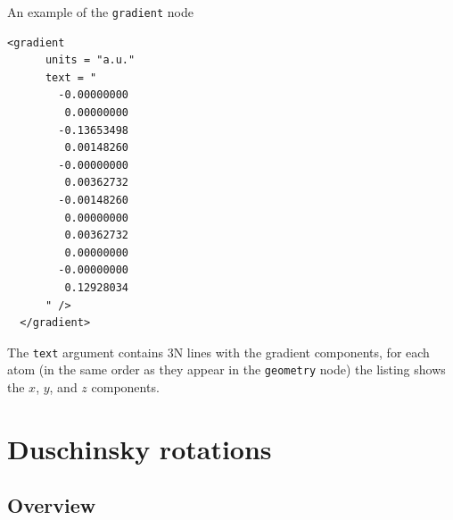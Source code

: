 \documentclass[11pt]{article}
\begin{document}
An example of the {\tt{}gradient} node
\begin{lstlisting}[frame=single,framerule=0pt]
  <gradient
      units = "a.u."
      text = "
        -0.00000000  
         0.00000000  
        -0.13653498  
         0.00148260  
        -0.00000000  
         0.00362732  
        -0.00148260  
         0.00000000  
         0.00362732  
         0.00000000
        -0.00000000
         0.12928034
      " />
  </gradient>
\end{lstlisting}
The {\tt{}text} argument contains 3N lines with the gradient components, for each atom (in the same order as they appear in the {\tt{}geometry} node) the listing shows the $x$, $y$, and $z$ components.

\section{Duschinsky rotations}
\label{sec:dushinsky}

\subsection{Overview}
\label{sec:dhush:overview}
\end{document}
